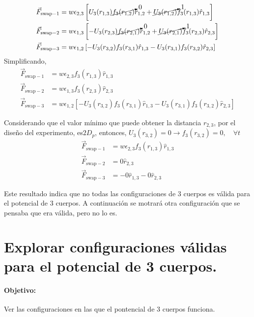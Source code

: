 \documentclass[../main.tex]{subfiles}
\begin{document}
\begin{align*}
    \vec{F}_{\mathrm{swap}-1} &= w\epsilon_{2,3}\left[
        U_3(r_{1,3})\cancelto{0}{f_3(r_{1,2})}\hat{r}_{1,2} + \cancelto{1}{U_3(r_{1,2})}f_3(r_{1,3})\hat{r}_{1,3}
    \right] \\
    \vec{F}_{\mathrm{swap}-2} &= w\epsilon_{1,3}\left[
        -U_3(r_{2,3})\cancelto{0}{f_3(r_{2,1})}\hat{r}_{1,2} + \cancelto{1}{U_3(r_{2,1})}f_3(r_{2,3})\hat{r}_{2,3}
    \right] \\
    \vec{F}_{\mathrm{swap}-3} &= w\epsilon_{1,2}\left[
            -U_3(r_{3,2})f_3(r_{3,1})\hat{r}_{1,3} - U_3(r_{3,1})f_3(r_{3,2})\hat{r}_{2,3}
    \right]
\end{align*}
Simplificando,
\begin{align*}
    \vec{F}_{\mathrm{swap}-1} &= w\epsilon_{2,3}
        f_3(r_{1,3})\hat{r}_{1,3}
     \\
    \vec{F}_{\mathrm{swap}-2} &= w\epsilon_{1,3}
        f_3(r_{2,3})\hat{r}_{2,3}
     \\
    \vec{F}_{\mathrm{swap}-3} &= w\epsilon_{1,2}\left[
            -U_3(r_{3,2})f_3(r_{3,1})\hat{r}_{1,3} - U_3(r_{3,1})f_3(r_{3,2})\hat{r}_{2,3}
    \right]
\end{align*}

Considerando que el valor mínimo que puede obtener la distancia \(r_{2,3}\), por el diseño del experimento, es\(2D_p\), entonces, \(U_3(r_{3,2}) = 0\rightarrow f_3(r_{3,2})=0,\quad\forall t\)
\begin{align*}
    \vec{F}_{\mathrm{swap}-1} &= w\epsilon_{2,3}
        f_3(r_{1,3})\hat{r}_{1,3}
     \\
    \vec{F}_{\mathrm{swap}-2} &= 0\hat{r}_{2,3}
     \\
    \vec{F}_{\mathrm{swap}-3} &= -0\hat{r}_{1,3}-0\hat{r}_{2,3}
\end{align*}

Este resultado indica que no todas las configuraciones de 3 cuerpos es válida para el potencial de 3 cuerpos.
A continuación se motrará otra configuración que se pensaba que era válida, pero no lo es.

\section{Explorar configuraciones válidas para el potencial de 3 cuerpos.}

\paragraph{Objetivo:}  Ver las configuraciones en las que el pontencial de 3 cuerpos funciona.
\end{document}
